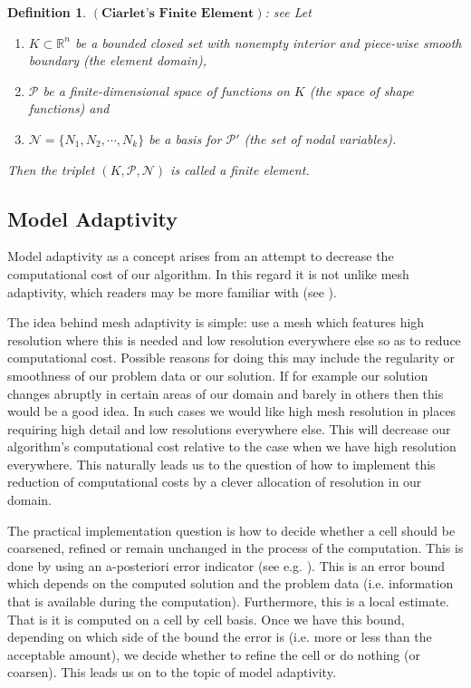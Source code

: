 \documentclass[12pt,a4paper]{article}
\newtheorem{definition}[theorem]{Definition}
\theoremstyle{definition}
\begin{document}
\begin{definition}{$\left(\textbf{Ciarlet's Finite Element}\right)$: see \cite[\S3.1: Definition 3.1.1]{brenner2007mathematical}}\label{defn_finite-element}
	Let
\begin{enumerate}
\item $K\subset \mathbb{R}^n$ be a bounded closed set with nonempty interior and piece-wise smooth boundary (the element domain),
\item $\mathcal{P}$ be a finite-dimensional space of functions on $K$ (the space of shape functions) and
\item $\mathcal{N}=\lbrace N_1,N_2,\cdots,N_k \rbrace$ be a basis for $\mathcal{P}'$ (the set of nodal variables).
\end{enumerate}
Then the triplet $\left(K,\mathcal{P},\mathcal{N}\right)$ is called a finite element.
\end{definition}


\subsection{Model Adaptivity}
Model adaptivity as a concept arises from an attempt to decrease the computational
cost of our algorithm. In this regard it is not unlike mesh adaptivity, which
readers may be more familiar with (see \cite{ern2013theory}).   

The idea behind mesh adaptivity is simple: use a mesh which features high resolution  where this is needed and low resolution everywhere else so as to reduce computational cost.  Possible reasons for doing this may include the regularity or smoothness of our problem data or our solution.  If for example our solution changes abruptly in certain areas of our domain and barely in others then this would be a good idea.  In such cases we would like high mesh resolution in places requiring high detail and low resolutions everywhere else.  This will decrease our algorithm's computational cost relative to the case when we have high resolution everywhere.  This naturally leads us to the question of how to implement this reduction of computational costs by a clever allocation of resolution in our domain.

The practical implementation question is how to decide whether a cell should be coarsened, refined or remain unchanged in the process of the computation.  This is done by using an a-posteriori error indicator (see e.g. \cite{braess2007finite}).  This is an error bound which depends on the computed solution and the problem data (i.e. information that is available during the computation).  Furthermore, this is a local estimate.  That is it is computed on a cell by cell basis.  Once we have this bound, depending on which side of the bound the error is (i.e. more or less than the acceptable amount),  we decide whether to refine the cell or do nothing (or coarsen).  This leads us on to the topic of model adaptivity.
\end{document}
